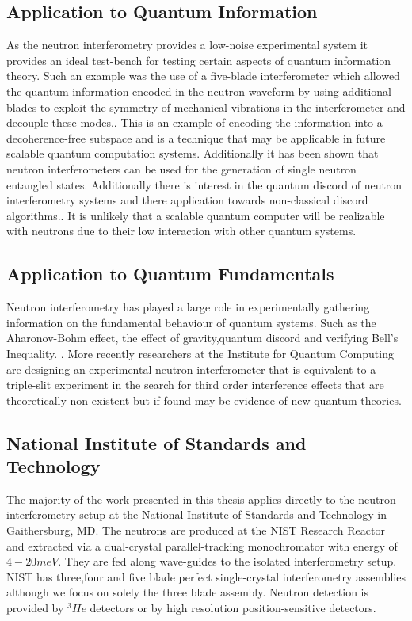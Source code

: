 \subsection{Application to Quantum Information}
As the neutron interferometry provides a low-noise experimental system it provides an ideal test-bench for testing certain aspects of quantum information theory. Such an example was the use of a five-blade interferometer which allowed the quantum information encoded in the neutron waveform by using additional blades to exploit the symmetry of mechanical vibrations in the interferometer and decouple these modes.\cite{five_blade}. This is an example of encoding the information into a decoherence-free subspace and is a technique that may be applicable in future scalable quantum computation systems. Additionally it has been shown that neutron interferometers can be used for the generation of single neutron entangled states. \cite{neutron_entanglement}   Additionally there is interest in the quantum discord of neutron interferometry systems and there application towards non-classical discord algorithms.\cite{noise_neutron}. It is unlikely that a scalable quantum computer will be realizable with neutrons due to their low interaction with other quantum systems.  
\subsection{Application to Quantum Fundamentals}
Neutron interferometry has played a large role in experimentally gathering information on the fundamental behaviour of quantum systems. Such as the Aharonov-Bohm effect, the effect of gravity,quantum discord and verifying Bell's Inequality. \cite{neutron_history}\cite{cow}\cite{noise_neutron}\cite{bells_inequality}. More recently researchers at the Institute for Quantum Computing are designing an experimental neutron interferometer that is equivalent to a triple-slit experiment in the search for third order interference effects that are theoretically non-existent but if found may be evidence of new quantum theories.\cite{three_slit} 
\subsection{National Institute of Standards and Technology}
The majority of the work presented in this thesis applies directly to the neutron interferometry setup at the National Institute of Standards and Technology in Gaithersburg, MD. The neutrons are produced at the NIST Research Reactor and extracted via a dual-crystal parallel-tracking monochromator with energy of $4-20 meV$. They are fed along wave-guides to the isolated interferometry setup. NIST has three,four and five blade perfect single-crystal interferometry assemblies although we focus on solely the three blade assembly. Neutron detection is provided by $^3He$ detectors or by high resolution position-sensitive detectors.\cite{nist_setup}\cite{nist_powerpoint} 

